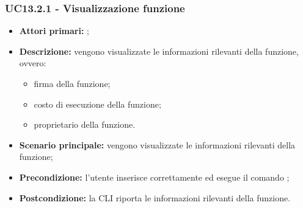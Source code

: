 \subsubsection{UC13.2.1 - Visualizzazione funzione}
\begin{itemize}
	\item \textbf{Attori primari:} \us{};
	\item \textbf{Descrizione:} vengono visualizzate le informazioni rilevanti della funzione, ovvero:
	\begin{itemize}
		\item firma della funzione;
		\item costo di esecuzione della funzione;
		\item proprietario della funzione. 
	\end{itemize}
	\item \textbf{Scenario principale:} vengono visualizzate le informazioni rilevanti della funzione;
	\item \textbf{Precondizione:} l'utente inserisce correttamente ed esegue il comando \plista{};
	\item \textbf{Postcondizione:} la CLI riporta le informazioni rilevanti della funzione.
\end{itemize}